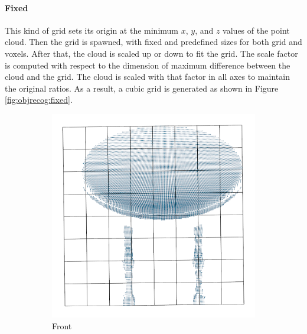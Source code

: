 \paragraph{Fixed}

This kind of grid sets its origin at the minimum $x$, $y$, and $z$ values of the point cloud. Then the grid is spawned, with fixed and predefined sizes for both grid and voxels. After that, the cloud is scaled up or down to fit the grid. The scale factor is computed with respect to the dimension of maximum difference between the cloud and the grid. The cloud is scaled with that factor in all axes to maintain the original ratios. As a result, a cubic grid is generated as shown in Figure \ref{fig:objrecog:fixed}.

\begin{figure}[!ht]
	\centering
	\hfill
	\begin{subfigure}{0.325\textwidth}
		\centering
		\includegraphics[width=\linewidth]{Figures/ObjRecog/fixed_front}
		\caption{Front}
		\label{subfig:objrecog:fixed:front}
	\end{subfigure}
	\hfill
	\begin{subfigure}{0.325\textwidth}
		\centering

\end{subfigure}
\end{figure}
